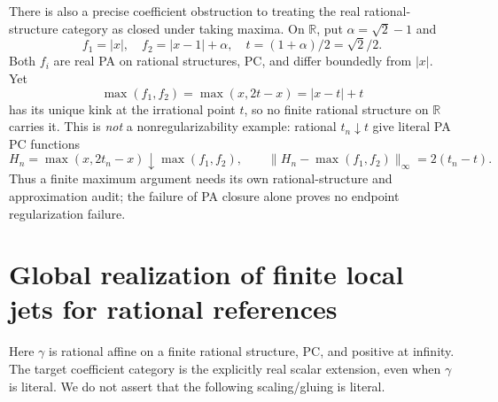 \documentclass[11pt]{article}
\newcommand{\R}{\mathbb R}
\begin{document}
There is also a precise coefficient obstruction to treating the
real rational-structure category as closed under taking maxima.
On \(\R\), put \(\alpha=\sqrt2-1\) and
\[
 f_1=|x|,\quad f_2=|x-1|+\alpha,\quad
 t=(1+\alpha)/2=\sqrt2/2.
\]
Both \(f_i\) are real PA on rational structures, PC, and differ
boundedly from \(|x|\). Yet
\[
 \max(f_1,f_2)=\max(x,2t-x)=|x-t|+t
\]
has its unique kink at the irrational point \(t\), so no finite rational
structure on \(\R\) carries it. This is \emph{not} a nonregularizability
example: rational \(t_n\downarrow t\) give literal PA PC functions
\[
 H_n=\max(x,2t_n-x)\downarrow \max(f_1,f_2),\qquad
 \|H_n-\max(f_1,f_2)\|_\infty=2(t_n-t).
\]
Thus a finite maximum argument needs its own rational-structure and
approximation audit; the failure of PA closure alone proves no
endpoint regularization failure.

\section{Global realization of finite local jets for rational references}\label{jet-section}
Here $\gamma$ is rational affine on a finite rational structure, PC, and
positive at infinity. The target coefficient category is the explicitly
real scalar extension, even when $\gamma$ is literal. We do not assert
that the following scaling/gluing is literal.
\end{document}
